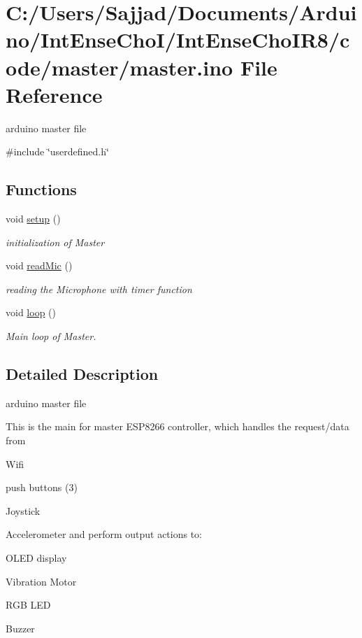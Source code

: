 \hypertarget{master_8ino}{}\section{C\+:/\+Users/\+Sajjad/\+Documents/\+Arduino/\+Int\+Ense\+Cho\+I/\+Int\+Ense\+Cho\+I\+R8/code/master/master.ino File Reference}
\label{master_8ino}


arduino master file  


{\ttfamily \#include \char`\"{}userdefined.\+h\char`\"{}}\newline
\subsection*{Functions}
\begin{DoxyCompactItemize}
\item 
void \mbox{\hyperlink{master_8ino_a4fc01d736fe50cf5b977f755b675f11d}{setup}} ()
\begin{DoxyCompactList}\small\item\em initialization of Master \end{DoxyCompactList}\item 
void \mbox{\hyperlink{master_8ino_acb567cd7c0b4da511205a0194cb9da81}{read\+Mic}} ()
\begin{DoxyCompactList}\small\item\em reading the Microphone with timer function \end{DoxyCompactList}\item 
void \mbox{\hyperlink{master_8ino_afe461d27b9c48d5921c00d521181f12f}{loop}} ()
\begin{DoxyCompactList}\small\item\em Main loop of Master. \end{DoxyCompactList}\end{DoxyCompactItemize}


\subsection{Detailed Description}
arduino master file 

This is the main for master E\+S\+P8266 controller, which handles the request/data from
\begin{DoxyItemize}
\item Wifi
\item push buttons (3)
\item Joystick
\item Accelerometer and perform output actions to\+:
\item O\+L\+ED display
\item Vibration Motor
\item R\+GB L\+ED
\item Buzzer
\end{DoxyItemize}

